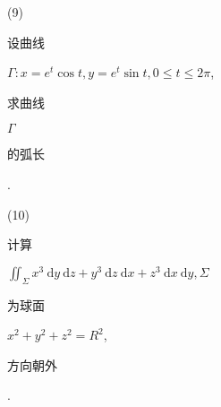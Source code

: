 \documentclass[10pt]{article}
\begin{document}
(9) \begin{CJK}{UTF8}{mj}设曲线\end{CJK} $\Gamma: x=e^{t} \cos t, y=e^{t} \sin t, 0 \leqslant t \leqslant 2 \pi$, \begin{CJK}{UTF8}{mj}求曲线\end{CJK} $\Gamma$ \begin{CJK}{UTF8}{mj}的弧长\end{CJK}.

(10) \begin{CJK}{UTF8}{mj}计算\end{CJK} $\iint_{\Sigma} x^{3} \mathrm{~d} y \mathrm{~d} z+y^{3} \mathrm{~d} z \mathrm{~d} x+z^{3} \mathrm{~d} x \mathrm{~d} y, \Sigma$ \begin{CJK}{UTF8}{mj}为球面\end{CJK} $x^{2}+y^{2}+z^{2}=R^{2}$, \begin{CJK}{UTF8}{mj}方向朝外\end{CJK}.
\end{document}
